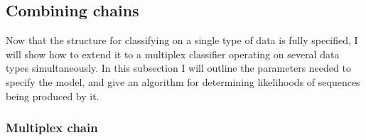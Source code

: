 \documentclass[12pt,a4paper,twoside,openright]{report}
\begin{document}
\subsection{Combining chains}

Now that the structure for classifying on a single type of data is fully specified, I will show how to extend it to a multiplex classifier operating on several data types simultaneously. In this subsection I will outline the parameters needed to specify the model, and give an algorithm for determining likelihoods of sequences being produced by it.

\subsubsection{Multiplex chain}\label{secmuxchaiin}
\end{document}
